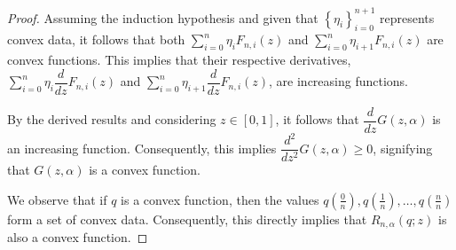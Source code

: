 \documentclass[10pt,a4paper]{amsart}
\begin{document}
\begin{proof}
Assuming the induction hypothesis and given that $\left \{ \eta_{i} \right \}_{i=0}^{n+1}$ represents convex data, it follows that both $ \sum_{i=0}^{n}\eta_{i}F_{n,i}(z) $ and $ \sum_{i=0}^{n}\eta_{i+1}F_{n,i}(z) $ are convex functions. This implies that their respective derivatives, $ \sum_{i=0}^{n}\eta_{i} \dfrac{d}{dz} F_{n,i}(z)$ and $\sum_{i=0}^{n}\eta_{i+1} \dfrac{d}{dz} F_{n,i}(z) $, are increasing functions.


By the derived results and considering $ z \in [0,1] $, it follows that $ \dfrac{d}{dz} G(z,\alpha) $ is an increasing function. Consequently, this implies $ \dfrac{d^2}{dz^2} G(z,\alpha) \geq 0 $, signifying that $ G(z,\alpha) $ is a convex function.


We observe that if $ q $ is a convex function, then the values $ q\left(\frac{0}{n}\right), q\left(\frac{1}{n}\right), \ldots, q\left(\frac{n}{n}\right) $ form a set of convex data. Consequently, this directly implies that $ R_{n,\alpha}(q;z) $ is also a convex function.
\end{proof}
\end{document}
